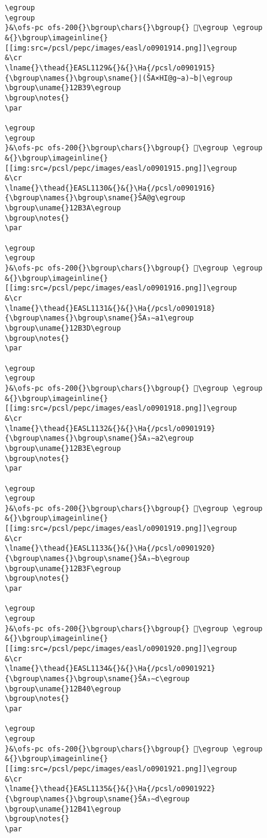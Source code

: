\begin{verbatim}
\egroup
\egroup
}&\ofs-pc ofs-200{}\bgroup\chars{}\bgroup{} 𒬸\egroup \egroup
&{}\bgroup\imageinline{}[[img:src=/pcsl/pepc/images/easl/o0901914.png]]\egroup
&\cr
\lname{}\thead{}EASL1129&{}&{}\Ha{/pcsl/o0901915}{\bgroup\names{}\bgroup\sname{}|(ŠA×HI@g∼a)∼b|\egroup
\bgroup\uname{}12B39\egroup
\bgroup\notes{}
\par 

\egroup
\egroup
}&\ofs-pc ofs-200{}\bgroup\chars{}\bgroup{} 𒬹\egroup \egroup
&{}\bgroup\imageinline{}[[img:src=/pcsl/pepc/images/easl/o0901915.png]]\egroup
&\cr
\lname{}\thead{}EASL1130&{}&{}\Ha{/pcsl/o0901916}{\bgroup\names{}\bgroup\sname{}ŠA@g\egroup
\bgroup\uname{}12B3A\egroup
\bgroup\notes{}
\par 

\egroup
\egroup
}&\ofs-pc ofs-200{}\bgroup\chars{}\bgroup{} 𒬺\egroup \egroup
&{}\bgroup\imageinline{}[[img:src=/pcsl/pepc/images/easl/o0901916.png]]\egroup
&\cr
\lname{}\thead{}EASL1131&{}&{}\Ha{/pcsl/o0901918}{\bgroup\names{}\bgroup\sname{}ŠA₃∼a1\egroup
\bgroup\uname{}12B3D\egroup
\bgroup\notes{}
\par 

\egroup
\egroup
}&\ofs-pc ofs-200{}\bgroup\chars{}\bgroup{} 𒬽\egroup \egroup
&{}\bgroup\imageinline{}[[img:src=/pcsl/pepc/images/easl/o0901918.png]]\egroup
&\cr
\lname{}\thead{}EASL1132&{}&{}\Ha{/pcsl/o0901919}{\bgroup\names{}\bgroup\sname{}ŠA₃∼a2\egroup
\bgroup\uname{}12B3E\egroup
\bgroup\notes{}
\par 

\egroup
\egroup
}&\ofs-pc ofs-200{}\bgroup\chars{}\bgroup{} 𒬾\egroup \egroup
&{}\bgroup\imageinline{}[[img:src=/pcsl/pepc/images/easl/o0901919.png]]\egroup
&\cr
\lname{}\thead{}EASL1133&{}&{}\Ha{/pcsl/o0901920}{\bgroup\names{}\bgroup\sname{}ŠA₃∼b\egroup
\bgroup\uname{}12B3F\egroup
\bgroup\notes{}
\par 

\egroup
\egroup
}&\ofs-pc ofs-200{}\bgroup\chars{}\bgroup{} 𒬿\egroup \egroup
&{}\bgroup\imageinline{}[[img:src=/pcsl/pepc/images/easl/o0901920.png]]\egroup
&\cr
\lname{}\thead{}EASL1134&{}&{}\Ha{/pcsl/o0901921}{\bgroup\names{}\bgroup\sname{}ŠA₃∼c\egroup
\bgroup\uname{}12B40\egroup
\bgroup\notes{}
\par 

\egroup
\egroup
}&\ofs-pc ofs-200{}\bgroup\chars{}\bgroup{} 𒭀\egroup \egroup
&{}\bgroup\imageinline{}[[img:src=/pcsl/pepc/images/easl/o0901921.png]]\egroup
&\cr
\lname{}\thead{}EASL1135&{}&{}\Ha{/pcsl/o0901922}{\bgroup\names{}\bgroup\sname{}ŠA₃∼d\egroup
\bgroup\uname{}12B41\egroup
\bgroup\notes{}
\par 


\end{verbatim}
